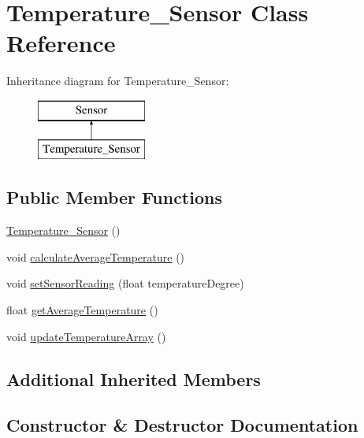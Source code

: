 \hypertarget{class_temperature___sensor}{}\section{Temperature\+\_\+\+Sensor Class Reference}
\label{class_temperature___sensor}
Inheritance diagram for Temperature\+\_\+\+Sensor\+:\begin{figure}[H]
\begin{center}
\leavevmode
\includegraphics[height=2.000000cm]{class_temperature___sensor}
\end{center}
\end{figure}
\subsection*{Public Member Functions}
\begin{DoxyCompactItemize}
\item 
\mbox{\hyperlink{class_temperature___sensor_ab0f4f8edbe06c0829adf2913363c8ec6}{Temperature\+\_\+\+Sensor}} ()
\item 
void \mbox{\hyperlink{class_temperature___sensor_a40ebb3a74c2840e22264aaa61c0e7ec4}{calculate\+Average\+Temperature}} ()
\item 
void \mbox{\hyperlink{class_temperature___sensor_a9dcb003cce1faf22a5a22071ca95b2b4}{set\+Sensor\+Reading}} (float temperature\+Degree)
\item 
float \mbox{\hyperlink{class_temperature___sensor_a2d3feee236f20096f59ee049c633d69f}{get\+Average\+Temperature}} ()
\item 
void \mbox{\hyperlink{class_temperature___sensor_aab99e13937e839433d86f1b946e82e6b}{update\+Temperature\+Array}} ()
\end{DoxyCompactItemize}
\subsection*{Additional Inherited Members}


\subsection{Constructor \& Destructor Documentation}
\mbox{\label{class_temperature___sensor_ab0f4f8edbe06c0829adf2913363c8ec6}} 
